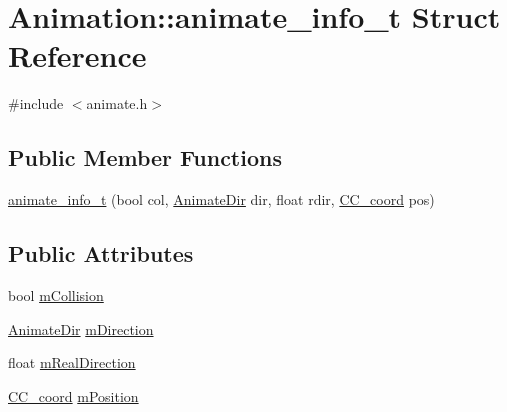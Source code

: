 \hypertarget{a00002}{\section{Animation\-:\-:animate\-\_\-info\-\_\-t Struct Reference}
\label{a00002}
}


{\ttfamily \#include $<$animate.\-h$>$}

\subsection*{Public Member Functions}
\begin{DoxyCompactItemize}
\item 
\hyperlink{a00002_a58263c83381a11c44e4908ff38d7f9c5}{animate\-\_\-info\-\_\-t} (bool col, \hyperlink{a00196_a6feaf30c8830fe6fcc0982cb7e9621ab}{Animate\-Dir} dir, float rdir, \hyperlink{a00029}{C\-C\-\_\-coord} pos)
\end{DoxyCompactItemize}
\subsection*{Public Attributes}
\begin{DoxyCompactItemize}
\item 
bool \hyperlink{a00002_af678a7572a0daf31df7f6eec1114c2b7}{m\-Collision}
\item 
\hyperlink{a00196_a6feaf30c8830fe6fcc0982cb7e9621ab}{Animate\-Dir} \hyperlink{a00002_a36f03371754a97ef6b02d325a23fee91}{m\-Direction}
\item 
float \hyperlink{a00002_a57c5464407bead32de395f20f4da671d}{m\-Real\-Direction}
\item 
\hyperlink{a00029}{C\-C\-\_\-coord} \hyperlink{a00002_a85e0fbf440dfb09fcbb34cf453e0b580}{m\-Position}
\end{DoxyCompactItemize}


